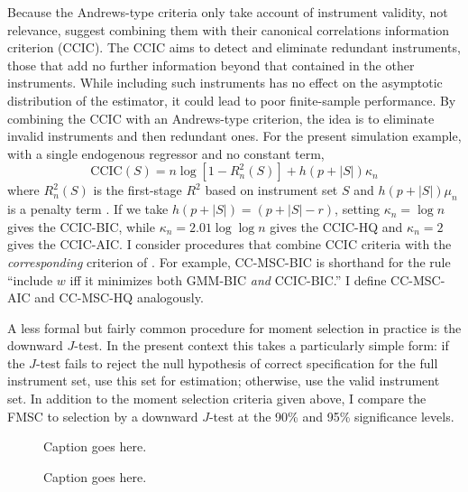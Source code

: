 Because the Andrews-type criteria only take account of instrument validity, not relevance, \cite{HallPeixe2003} suggest combining them with their canonical correlations information criterion (CCIC). 
The CCIC aims to detect and eliminate redundant instruments, those that add no further information beyond that contained in the other instruments. 
While including such instruments has no effect on the asymptotic distribution of the estimator, it could lead to poor finite-sample performance. 
By combining the CCIC with an Andrews-type criterion, the idea is to eliminate invalid instruments and then redundant ones. 
For the present simulation example, with a single endogenous regressor and no constant term, 
	\begin{equation}
	\mbox{CCIC}(S) = n \log\left[1 - R_n^2(S) \right] + h(p + |S|)\kappa_n
	\end{equation}
where $R_n^2(S)$ is the first-stage $R^2$ based on instrument set $S$ and $h(p + |S|)\mu_n$ is a penalty term \citep{Jana2005}. 
If we take $h(p + |S|) = (p + |S| - r)$, setting $\kappa_n = \log{n}$ gives the CCIC-BIC, while $\kappa_n = 2.01 \log{\log{n}}$ gives the CCIC-HQ  and $\kappa_n = 2$ gives the CCIC-AIC. 
I consider procedures that combine CCIC criteria with the \emph{corresponding} criterion of \cite{Andrews1999}. 
For example, CC-MSC-BIC is shorthand for the rule ``include $w$ iff it minimizes both  GMM-BIC \emph{and} CCIC-BIC.'' 
I define CC-MSC-AIC and CC-MSC-HQ analogously.

A less formal but fairly common procedure for moment selection in practice is the downward $J$-test. 
In the present context this takes a particularly simple form: if the $J$-test fails to reject the null hypothesis of correct specification for the full instrument set, use this set for estimation; otherwise, use the valid instrument set. 
In addition to the moment selection criteria given above, I compare the FMSC to selection by a downward $J$-test at the 90\% and 95\% significance levels. 

\begin{figure}
\centering
	
	\caption{Caption goes here.}
\end{figure}





\begin{figure}
\centering
	
	\caption{Caption goes here.}
\end{figure}

